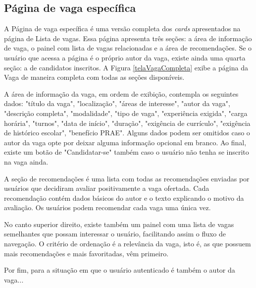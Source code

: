\documentclass[cic,tc]{iiufrgs}
\begin{document}
\subsection{Página de vaga específica}
\label{PDVFunVaga}

A Página de vaga específica é uma versão completa dos \textit{cards} apresentados na página de Lista de vagas. Essa página apresenta três seções: a área de informação de vaga, o painel com lista de vagas relacionadas e a área de recomendações. Se o usuário que acessa a página é o próprio autor da vaga, existe ainda uma quarta seção: a de candidatos inscritos. A Figura \ref{telaVagaCompleta} exibe a página da Vaga de maneira completa com todas as seções disponíveis.

A área de informação da vaga, em ordem de exibição, contempla os seguintes dados: "título da vaga", "localização", "áreas de interesse", "autor da vaga", "descrição completa", "modalidade", "tipo de vaga", "experiência exigida", "carga horária", "turnos", "data de início", "duração", "exigência de currículo", "exigência de histórico escolar", "benefício PRAE". Alguns dados podem ser omitidos caso o autor da vaga opte por deixar alguma informação opcional em branco. Ao final, existe um botão de "Candidatar-se" também caso o usuário não tenha se inscrito na vaga ainda.

A seção de recomendações é uma lista com todas as recomendações enviadas por usuários que decidiram avaliar positivamente a vaga ofertada. Cada recomendação contém dados básicos do autor e o texto explicando o motivo da avaliação. Os usuários podem recomendar cada vaga uma única vez.

No canto superior direito, existe também um painel com uma lista de vagas semelhantes que possam interessar o usuário, facilitando assim o fluxo de navegação. O critério de ordenação é a relevância da vaga, isto é, as que possuem mais recomendações e mais favoritadas, vêm primeiro.

Por fim, para a situação em que o usuário autenticado é também o autor da vaga...
\end{document}
